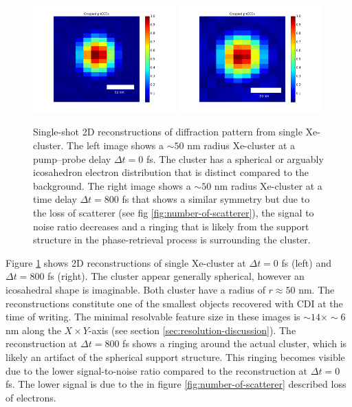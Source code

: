 \begin{figure}
	\centering
		\includegraphics[width=0.49\textwidth]{images/results/Xe_0_fs.png}
		\includegraphics[width=0.49\textwidth]{images/results/Xe_800_fs.png}
	\caption{Single-shot 2D reconstructions of diffraction pattern from single Xe-cluster. The left image shows a $\sim 50$ nm radius Xe-cluster at a pump--probe delay $\Delta t=0$ fs. The cluster has a spherical or arguably icosahedron electron distribution that is distinct compared to the background. The right image shows a $\sim 50$ nm radius Xe-cluster at a time delay $\Delta t=800$ fs that shows a similar symmetry but due to the loss of scatterer (see fig \ref{fig:number-of-scatterer}), the signal to noise ratio decreases and a ringing that is likely from the support structure in the phase-retrieval process is surrounding the cluster.}
	\label{fig:Xe-2D-reconstructions}
\end{figure}
Figure \ref{fig:Xe-2D-reconstructions} shows 2D reconstructions of single Xe-cluster at $\Delta t = 0$ fs (left) and $\Delta t=800$ fs (right). The cluster appear generally spherical, however an icosahedral shape is imaginable. Both cluster have a radius of $r\approx 50$ nm. The reconstructions constitute one of the smallest objects recovered with CDI at the time of writing. The minimal resolvable feature size in these images is $\sim 14\times \sim 6$ nm along the $X\times Y$-axis (see section \ref{sec:resolution-discussion}). The reconstruction at $\Delta t=800$ fs shows a ringing around the actual cluster, which is likely an artifact of the spherical support structure. This ringing becomes visible due to the lower signal-to-noise ratio compared to the reconstruction at $\Delta t=0$ fs. The lower signal is due to the in figure \ref{fig:number-of-scatterer} described loss of electrons.
%
%
%
